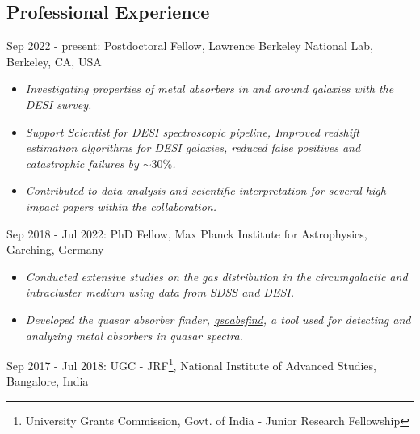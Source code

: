 \documentclass[12pt,letterpaper]{article}
\begin{document}
\subsection{Professional Experience}
\begin{list}{}{\cvlist}
\item Sep 2022 - present: Postdoctoral Fellow, Lawrence Berkeley National Lab, Berkeley, CA, USA \\
\begin{itemize}
 \item \emph{Investigating properties of metal absorbers in and around galaxies with the DESI survey.}
 \item \emph{Support Scientist for DESI spectroscopic pipeline, Improved redshift estimation algorithms for DESI galaxies, reduced false positives and catastrophic failures by $\sim 30\%$.}
  \item \emph{Contributed to data analysis and scientific interpretation for several high-impact papers within the collaboration.}
  \vspace{-1mm}
\end{itemize}
\item Sep 2018 - Jul 2022: PhD Fellow, Max Planck Institute for Astrophysics, Garching, Germany
\begin{itemize}
\item \emph{Conducted extensive studies on the gas distribution in the circumgalactic and intracluster medium using data from SDSS and DESI.}
  \vspace{-1mm}
\item \emph{Developed the quasar absorber finder, \href{https://github.com/abhi0395/qsoabsfind}{qsoabsfind}, a tool used for detecting and analyzing metal absorbers in quasar spectra.}
\end{itemize}
\item Sep 2017 - Jul 2018: UGC - JRF\footnote{University Grants Commission, Govt. of India - Junior Research Fellowship}, National Institute of Advanced Studies, Bangalore, India
\end{list}
\vspace{-1.5mm}
\end{document}
